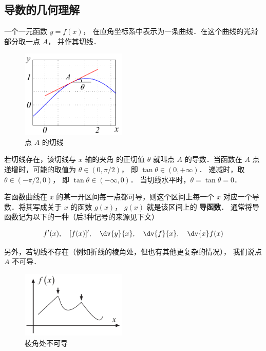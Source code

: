 

\subsection{导数的几何理解}

一个一元函数 $y = f\left( x \right)$， 在直角坐标系中表示为一条曲线．在这个曲线的光滑部分取一点 $A$， 并作其切线．

\begin{figure}[ht]
\centering
\includegraphics[width=5cm]{./figures/Der1.pdf}
\caption{点 $A$ 的切线}
\end{figure}


若切线存在，该切线与 $x$ 轴的夹角 的正切值 $\theta$ 就叫点 $A$ 的导数．当函数在 $A$ 点递增时，可能的取值为 $\theta  \in \left( {0,\pi/2} \right)$， 即 $\tan \theta  \in \left( {0, + \infty } \right)$． 递减时，取 $\theta  \in (-\pi/2,0)$， 即 $\tan \theta  \in (-\infty ,0)$． 当切线水平时，$\theta  = \tan \theta  = 0$． 

若函数曲线在 $x$ 的某一开区间每一点都可导，则这个区间上每一个 $x$ 对应一个导数．将其写成关于 $x$ 的函数 $g\left( x \right)$，  $g\left( x \right)$  就是该区间上的 \textbf{导函数}． 通常将导函数记为以下的一种（后3种记号的来源见下文）

\begin{equation}\label{Der_eq1}
f'(x),\quad [f(x)]',\quad \dv{y}{x},\quad \dv{f}{x},\quad \dv{x}f(x)
\end{equation}


另外，若切线不存在（例如折线的棱角处，但也有其他更复杂的情况）， 我们说点 $A$ 不可导．

\begin{figure}[ht]
\centering
\includegraphics[width=5cm]{./figures/Der3.pdf}
\caption{棱角处不可导}
\end{figure}


